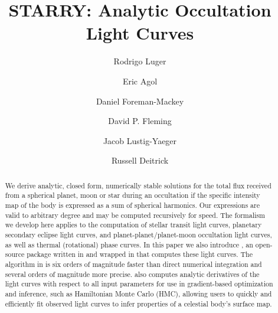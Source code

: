 \documentclass[modern]{aastex61}
\begin{document}
\setlength{\abovedisplayskip}{1.5em}
\setlength{\belowdisplayskip}{1.5em}

\title{%
    \textbf{STARRY}: Analytic Occultation Light Curves 
}

\author[0000-0002-0296-3826]{Rodrigo Luger}
%
\author[0000-0002-0802-9145]{Eric Agol}
%
\author[0000-0002-9328-5652]{Daniel Foreman-Mackey}
%
\author{David P. Fleming}
%
\author{Jacob Lustig-Yaeger}
%
\author{Russell Deitrick}


\begin{abstract}
We derive analytic, closed form, numerically stable solutions for the total flux
received from a spherical planet, moon or star during an occultation
if the specific intensity map of the body is expressed as a
sum of spherical harmonics. Our expressions are valid to arbitrary degree
and may be computed recursively for speed. The formalism we develop
here applies to the computation of stellar transit light curves,
planetary secondary eclipse light curves, and planet-planet/planet-moon
occultation light curves, as well as thermal (rotational) phase curves.
In this paper we also introduce \starry, an open-source package written in \cpp
and wrapped in \Python that computes these light curves.
The algorithm in \starry is six orders of magnitude faster than direct
numerical integration and several orders of magnitude more precise.
\starry also computes analytic derivatives of the light curves with respect to all input
parameters for use in gradient-based optimization and inference, such as
Hamiltonian Monte Carlo (HMC), allowing users to quickly and efficiently
fit observed light curves to infer properties of a celestial body's
surface map.
\href{https://github.com/rodluger/starry}{\color{linkcolor}\faGithub}
\href{https://rodluger.github.io/starry}{\color{linkcolor}\faBook}
\href{https://doi.org/10.5281/zenodo.1313022}{\color{linkcolor}\faTags}
\end{abstract}
\end{document}
